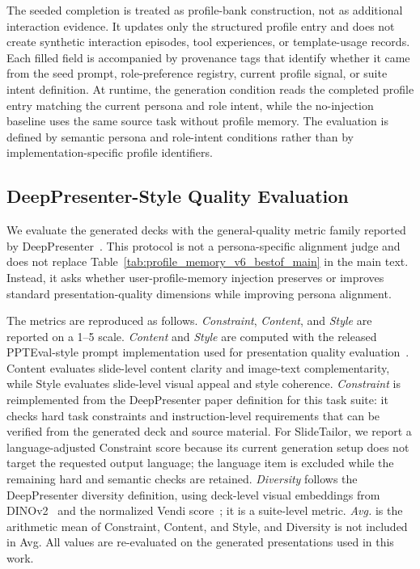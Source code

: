 The seeded completion is treated as profile-bank construction, not as
additional interaction evidence. It updates only the structured profile entry
and does not create synthetic interaction episodes, tool experiences, or
template-usage records. Each filled field is accompanied by provenance tags
that identify whether it came from the seed prompt, role-preference registry,
current profile signal, or suite intent definition. At runtime, the generation
condition reads the completed profile entry matching the current persona and
role intent, while the no-injection baseline uses the same source task without
profile memory. The evaluation is defined by semantic persona and role-intent
conditions rather than by implementation-specific profile identifiers.

\subsection{DeepPresenter-Style Quality Evaluation}
\label{app:deeppresenter_quality_eval}

We evaluate the generated decks with the general-quality metric family reported
by DeepPresenter~\citep{zheng2026deeppresenter}. This protocol is not a
persona-specific alignment judge and does not replace
Table~\ref{tab:profile_memory_v6_bestof_main} in the main text. Instead, it
asks whether user-profile-memory injection preserves or improves standard
presentation-quality dimensions while improving persona alignment.

The metrics are reproduced as follows. \textit{Constraint}, \textit{Content},
and \textit{Style} are reported on a 1--5 scale. \textit{Content} and
\textit{Style} are computed with the released PPTEval-style prompt
implementation used for presentation quality evaluation~\citep{zheng2025pptagent}.
Content evaluates slide-level content clarity and image-text complementarity,
while Style evaluates slide-level visual appeal and style coherence.
\textit{Constraint} is reimplemented from the DeepPresenter paper definition
for this task suite: it checks hard task constraints and instruction-level
requirements that can be verified from the generated deck and source material.
For SlideTailor, we report a language-adjusted Constraint score because its
current generation setup does not target the requested output language; the
language item is excluded while the remaining hard and semantic checks are
retained. \textit{Diversity} follows the DeepPresenter diversity definition,
using deck-level visual embeddings from DINOv2~\citep{oquab2023dinov2} and the
normalized Vendi score~\citep{friedman2023vendi}; it is a suite-level metric.
\textit{Avg.} is the arithmetic mean of Constraint, Content, and Style, and
Diversity is not included in Avg. All values are re-evaluated on the generated
presentations used in this work.


